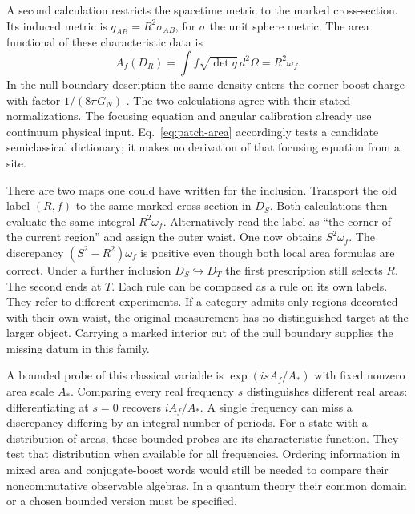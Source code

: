 \documentclass[11pt,letterpaper]{article}
\begin{document}
A second calculation restricts the spacetime metric to the marked
cross-section. Its induced metric is \(q_{AB}=R^2\sigma_{AB}\), for
\(\sigma\) the unit sphere metric. The area functional of these
characteristic data is
\begin{equation}
 A_f(D_R)=\int f\sqrt{\det q}\,d^2\Omega=R^2\omega_f .
 \label{eq:patch-area}
\end{equation}
In the null-boundary description the same density enters the corner
boost charge with factor \(1/(8\pi G_N)\)
\cite[Eq.~(3.63)]{nc}. The two calculations agree with their stated
normalizations. The focusing equation and angular calibration already
use continuum physical input. Eq.~\eqref{eq:patch-area} accordingly
tests a candidate semiclassical dictionary; it makes no derivation
of that focusing equation from a site.

There are two maps one could have written for the inclusion. Transport
the old label \((R,f)\) to the same marked cross-section in \(D_S\).
Both calculations then evaluate the same integral \(R^2\omega_f\).
Alternatively read the label as ``the corner of the current region''
and assign the outer waist. One now obtains \(S^2\omega_f\).
The discrepancy
\((S^2-R^2)\omega_f\) is positive even though both local area formulas
are correct. Under a further inclusion \(D_S\hookrightarrow D_T\) the
first prescription still selects \(R\). The second ends at \(T\).
Each rule can be composed as a rule on its own labels. They refer to
different experiments. If a category admits only regions decorated
with their own waist, the original measurement has no distinguished
target at the larger object. Carrying a marked interior cut of the
null boundary supplies the missing datum in this family.

A bounded probe of this classical variable is
\(\exp(i s A_f/A_*)\) with fixed nonzero area scale \(A_*\).
Comparing every real frequency \(s\) distinguishes different real
areas: differentiating at \(s=0\) recovers \(iA_f/A_*\).
A single frequency can miss a discrepancy differing by an integral
number of periods. For a state with a distribution of areas, these
bounded probes are its characteristic function. They test that
distribution when available for all frequencies. Ordering information
in mixed area and conjugate-boost words would still be needed to compare
their noncommutative observable algebras. In a quantum theory their common
domain or a chosen bounded version must be specified.
\end{document}
